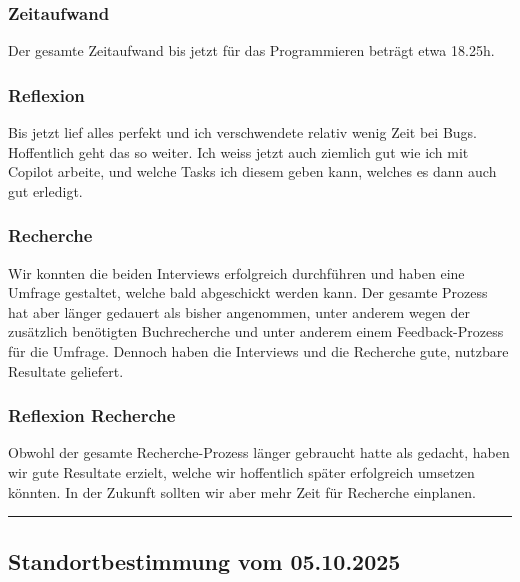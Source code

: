 \documentclass[a4paper,12pt]{article}
\newcommand{\StandortHeader}[1]{
    \subsection*{Standortbestimmung vom #1}
}
\newcommand{\StandortFooter}{
    \vspace{0.5cm}
    \hrule
    \vspace{0.5cm}
}
\begin{document}
\subsubsection*{Zeitaufwand}
Der gesamte Zeitaufwand bis jetzt für das Programmieren beträgt etwa 18.25h.

\subsubsection*{Reflexion}
Bis jetzt lief alles perfekt und ich verschwendete relativ wenig Zeit bei Bugs. Hoffentlich geht das so weiter. Ich weiss jetzt auch ziemlich gut wie ich mit Copilot arbeite, und welche Tasks ich diesem geben kann, welches es dann auch gut erledigt.

\subsubsection*{Recherche}
Wir konnten die beiden Interviews erfolgreich durchführen und haben eine Umfrage gestaltet, welche bald abgeschickt werden kann. Der gesamte Prozess hat aber länger gedauert als bisher angenommen, unter anderem wegen der zusätzlich benötigten Buchrecherche und unter anderem einem Feedback-Prozess für die Umfrage. Dennoch haben die Interviews und die Recherche gute, nutzbare Resultate geliefert.

\subsubsection*{Reflexion Recherche}
Obwohl der gesamte Recherche-Prozess länger gebraucht hatte als gedacht, haben wir gute Resultate erzielt, welche wir hoffentlich später erfolgreich umsetzen könnten. In der Zukunft sollten wir aber mehr Zeit für Recherche einplanen.
\StandortFooter

\StandortHeader{05.10.2025}
\end{document}
